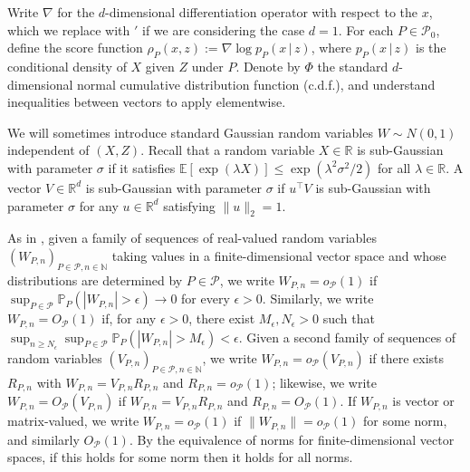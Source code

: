 \documentclass[aos]{imsart}
\renewcommand{\Pr}{\mathbb{P}}
\newcommand{\R}{\mathbb{R}}
\newcommand{\E}{\mathbb{E}}
\newcommand{\given}{\,|\,}
\begin{document}
	
	
	Write $\nabla$ for the $d$-dimensional differentiation operator with respect to the $x$, which we replace with $'$ if we are considering the case $d=1$. For each $P\in\mathcal{P}_0$, define the  score function $\rho_P(x,z) := \nabla \log p_P(x\given  z)$, where $p_P(x\given  z)$ is the conditional density of $X$ given $Z$ under $P$.
	Denote by $\Phi$ the standard $d$-dimensional normal cumulative distribution function (c.d.f.), and understand inequalities between vectors to apply elementwise.

	We will sometimes introduce standard Gaussian random variables $W\sim N(0,1)$ independent of $(X,Z)$. Recall that a random variable $X\in \R$ is sub-Gaussian with parameter $\sigma$ if it satisfies $\E[\exp(\lambda X)] \leq \exp(\lambda^2\sigma^2/2)$ for all $\lambda\in\R$. A vector $V\in\R^d$ is sub-Gaussian with parameter $\sigma$ if $u^{\top}V$ is sub-Gaussian with parameter $\sigma$ for any $u\in\R^d$ satisfying $\|u\|_2=1$.
	
		As in \cite{LundborgPartial}, given a family of sequences of real-valued random variables $(W_{P,n})_{P\in\mathcal{P}, n\in\mathbb{N}}$ taking values in a finite-dimensional vector space and whose distributions are determined by $P\in\mathcal{P}$, we write
	$W_{P,n} = o_{\mathcal{P}}(1)$ if $\sup_{P\in\mathcal{P}}\Pr_P(|W_{P,n}| > \epsilon) \to 0$ for every $\epsilon > 0$. Similarly, we write $W_{P,n} = O_{\mathcal{P}}(1)$
	if, for any $\epsilon > 0$, there exist $M_\epsilon, N_\epsilon > 0$ such that $\sup_{n\geq N_\epsilon} \sup_{P\in\mathcal{P}} \Pr_P (|W_{P,n}| > M_\epsilon) < \epsilon$. Given a second family of sequences of random variables $(V_{P,n})_{P\in\mathcal{P}, n\in\mathbb{N}}$, we write
	$W_{P,n} = o_\mathcal{P}(V_{P,n})$ if there exists $R_{P,n}$ with $W_{P,n} = V_{P,n} R_{P,n}$ and $R_{P,n}=o_\mathcal{P}(1)$; likewise, we write $W_{P,n} = O_\mathcal{P}(V_{P,n})$
	if $W_{P,n} = V_{P,n} R_{P,n}$ and $R_{P,n} = O_\mathcal{P}(1)$. If $W_{P,n}$ is vector or matrix-valued, we write $W_{P,n} = o_\mathcal{P}(1)$ if $\|W_{P,n}\| = o_\mathcal{P}(1)$ for some norm, and similarly $O_\mathcal{P}(1)$. By the equivalence of norms for finite-dimensional vector spaces, if this holds for some norm then it holds for all norms.
	
\end{document}
